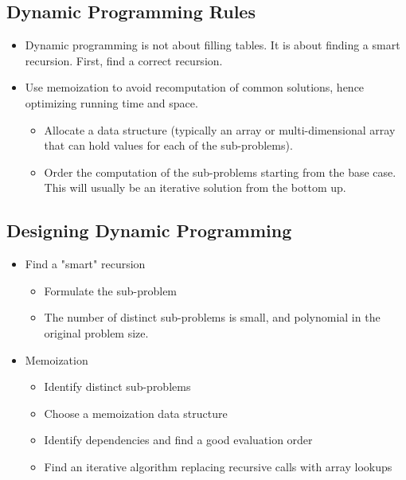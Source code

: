 \documentclass[12pt]{article}
\begin{document}
\subsection{Dynamic Programming Rules}
\begin{itemize}
    \item Dynamic programming is not about filling tables. It is about finding a smart recursion. First, find a correct recursion.
    \item Use memoization to avoid recomputation of common solutions, hence optimizing running time and space.
    \begin{itemize}
        \item Allocate a data structure (typically an array or multi-dimensional array that can hold values for each of the sub-problems).
        \item Order the computation of the sub-problems starting from the base case. This will usually be an iterative solution from the bottom up.
    \end{itemize}
\end{itemize}

\subsection{Designing Dynamic Programming}
\begin{itemize}
    \item Find a "smart" recursion
    \begin{itemize}
        \item Formulate the sub-problem
        \item The number of distinct sub-problems is small, and polynomial in the original problem size.
    \end{itemize}
    \item Memoization
    \begin{itemize}
        \item Identify distinct sub-problems
        \item Choose a memoization data structure
        \item Identify dependencies and find a good evaluation order
        \item Find an iterative algorithm replacing recursive calls with array lookups
    \end{itemize}
\end{itemize}
\end{document}
